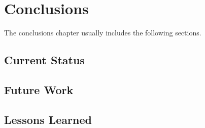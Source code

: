 \chapter{Conclusions}


The conclusions chapter usually includes the following sections.



\section{Current Status}

\section{Future Work}

\section{Lessons Learned}


